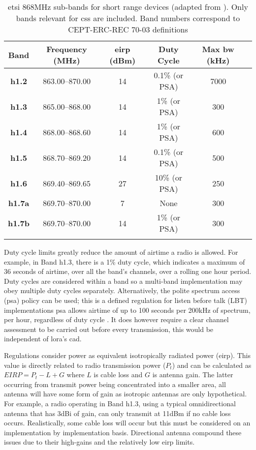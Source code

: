 \begin{table}[H]
\centering\small
\caption[\ac{etsi} 868MHz sub-band breakdown]{\ac{etsi} 868MHz sub-bands for short range devices (adapted from \cite{3YP:ETSI_HARMONISED_REG}). Only bands relevant for \ac{css} are included. Band numbers correspond to CEPT-ERC-REC 70-03 definitions \cite{3YP:CEPT_ERC_REC}}
\label{tab:ETSIBands}
\renewcommand*{\arraystretch}{1.1}
\begin{tabular}{c|ccccc}
    \toprule
    \textbf{Band} & \textbf{Frequency} (MHz) & \textbf{\ac{eirp}} (dBm)  & \textbf{Duty Cycle} & \textbf{Max \ac{bw}} (kHz) \\
    \midrule\addlinespace
    \textbf{h1.2} & 863.00--870.00 & 14 & 0.1\% (or PSA) & 7000 \\
    \textbf{h1.3} & 865.00--868.00 & 14 & 1\% (or PSA) & 300 \\
    \textbf{h1.4} & 868.00--868.60 & 14 & 1\% (or PSA) & 600 \\
    \textbf{h1.5} & 868.70--869.20 & 14 & 0.1\% (or PSA) & 500 \\
    \textbf{h1.6} & 869.40--869.65 & 27 & 10\% (or PSA) & 250 \\
    \textbf{h1.7a} & 869.70--870.00 & 7 & None & 300 \\
    \textbf{h1.7b} & 869.70--870.00 & 14 & 1\% (or PSA) & 300 \\   
    \addlinespace\bottomrule
\end{tabular}
\end{table}

Duty cycle limits greatly reduce the amount of airtime a radio is allowed. For example, in Band h1.3, there is a 1\% duty cycle, which indicates a maximum of 36 seconds of airtime, over all the band's channels, over a rolling one hour period. Duty cycles are considered within a band so a multi-band implementation may obey multiple duty cycles separately. Alternatively, the polite spectrum access (\ac{psa}) policy can be used; this is a defined regulation for listen before talk (LBT) implementations \ac{psa} allows airtime of up to 100 seconds per 200kHz of spectrum, per hour, regardless of duty cycle \cite{3YP:ETSI_PSA}. It does however require a clear channel assessment to be carried out before every transmission, this would be independent of \ac{lora}'s \ac{cad}.

Regulations consider power as equivalent isotropically radiated power (\ac{eirp}). This value is directly related to radio transmission power ($P_t$) and can be calculated as $EIRP = P_t - L + G$ where $L$ is cable loss and $G$ is antenna gain. The latter occurring from transmit power being concentrated into a smaller area, all antenna will have some form of gain as isotropic antennas are only hypothetical. For example, a radio operating in Band h1.3, using a typical omnidirectional antenna that has 3dBi of gain, can only transmit at 11dBm if no cable loss occurs. Realistically, some cable loss will occur but this must be considered on an implementation by implementation basis. Directional antenna compound these issues due to their high-gains and the relatively low \ac{eirp} limits.


